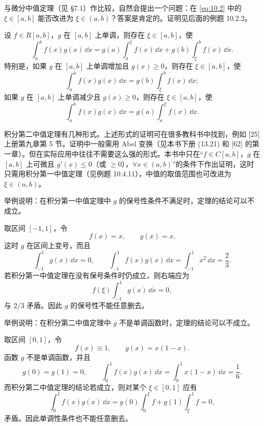 \begin{xremark}
与微分中值定理（见 §7.1）作比较，自然会提出一个问题：在 \eqref{eq:10.2} 中的 $\xi\in[a,b]$ 能否改进为 $\xi\in(a,b)$？答案是肯定的。证明见后面的例题 10.2.2。
\end{xremark}

\begin{xtheorem}[10.2.2（积分第二中值定理）]
设 $f\in R[a,b]$，$g$ 在 $[a,b]$ 上单调，则存在 $\xi\in[a,b]$，使
\[
  \int_a^b f(x)g(x)\,\dd x
  =g(a)\int_a^\xi f(x)\,\dd x+g(b)\int_\xi^b f(x)\,\dd x.
\]
特别是，如果 $g$ 在 $[a,b]$ 上单调增加且 $g(x)\geqslant0$，则存在 $\xi\in[a,b]$，使
\[
  \int_a^b f(x)g(x)\,\dd x=g(b)\int_\xi^b f(x)\,\dd x;
\]
如果 $g$ 在 $[a,b]$ 上单调减少且 $g(x)\geqslant0$，则存在 $\xi\in[a,b]$，使
\[
  \int_a^b f(x)g(x)\,\dd x=g(a)\int_a^\xi f(x)\,\dd x.
\]
\end{xtheorem}

\begin{xremark}
积分第二中值定理有几种形式。上述形式的证明可在很多教科书中找到，例如 [25] 上册第九章第 5 节。证明中一般需用 Abel 变换（见本书下册 (13.21) 和 [62] 的第一章）。但在实际应用中往往不需要这么强的形式。本书中只在“$f\in C[a,b]$，$g$ 在 $[a,b]$ 上可微且 $g'(x)\leqslant0$（或 $\geqslant0$），$\forall x\in(a,b)$”的条件下作出证明，这时只需用积分第一中值定理（见例题 10.4.11），中值的取值范围也可改进为 $\xi\in(a,b)$。
\end{xremark}

\begin{xthought}[1]
举例说明：在积分第一中值定理中 $g$ 的保号性条件不满足时，定理的结论可以不成立。
\end{xthought}
\begin{xsolution}
取区间 $[-1,1]$，令
\[
  f(x)=x,\qquad g(x)=x.
\]
这时 $g$ 在区间上变号，而且
\[
  \int_{-1}^1 g(x)\,\dd x=0,
  \qquad
  \int_{-1}^1 f(x)g(x)\,\dd x
  =\int_{-1}^1x^2\,\dd x=\frac23.
\]
若积分第一中值定理在没有保号条件时仍成立，则右端应为
\[
  f(\xi)\int_{-1}^1g(x)\,\dd x=0,
\]
与 $2/3$ 矛盾。因此 $g$ 的保号性不能任意删去。
\end{xsolution}


\begin{xthought}[2]
举例说明：在积分第二中值定理中 $g$ 不是单调函数时，定理的结论可以不成立。
\end{xthought}
\begin{xsolution}
取区间 $[0,1]$，令
\[
  f(x)\equiv1,\qquad g(x)=x(1-x).
\]
函数 $g$ 不是单调函数，并且
\[
  g(0)=g(1)=0,
  \qquad
  \int_0^1f(x)g(x)\,\dd x=\int_0^1x(1-x)\,\dd x=\frac16.
\]
而积分第二中值定理的结论若成立，则对某个 $\xi\in[0,1]$ 应有
\[
  \int_0^1f(x)g(x)\,\dd x
  =g(0)\int_0^\xi f+g(1)\int_\xi^1 f=0,
\]
矛盾。因此单调性条件也不能任意删去。
\end{xsolution}



